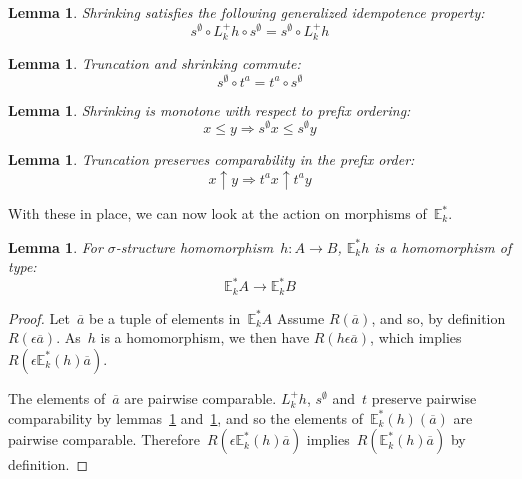 \documentclass{article}
\theoremstyle{plain}
\newtheorem{lemma}[theorem]{Lemma}
\theoremstyle{definition}
\theoremstyle{remark}
\numberwithin{theorem}{section}
\begin{document}
\begin{lemma}
\label{lem:s-idem}
Shrinking satisfies the following generalized idempotence property:
\begin{equation*}
    s^\emptyset \circ L^+_k h \circ s^\emptyset = s^\emptyset \circ L^+_k h
\end{equation*}
\end{lemma}
\begin{lemma}
\label{lem:t-s-commute}
Truncation and shrinking commute:
\begin{equation*}
    s^\emptyset \circ t^a = t^a \circ s^\emptyset
\end{equation*}
\end{lemma}
\begin{lemma}
\label{lem:s-monotone}
Shrinking is monotone with respect to prefix ordering:
\begin{equation*}
    x \leq y \Rightarrow s^\emptyset x \leq s^\emptyset y
\end{equation*}
\end{lemma}
\begin{lemma}
\label{lem:t-pres-comparability}
Truncation preserves comparability in the prefix order:
\begin{equation*}
    x \uparrow y \Rightarrow t^a x \uparrow t^a y
\end{equation*}
\end{lemma}
With these in place, we can now look at the action on morphisms of~$\mathbb{E}^*_k$.
\begin{lemma}
For $\sigma$-structure homomorphism~$h : A \rightarrow B$, $\mathbb{E}^*_k h$ is a homomorphism of type:
\begin{equation*}
    \mathbb{E}^*_k A \rightarrow \mathbb{E}^*_k B
\end{equation*}
\end{lemma}
\begin{proof}
Let~$\overline{a}$ be a tuple of elements in~$\mathbb{E}^*_k A$
Assume $R(\overline{a})$, and so, by definition $R(\epsilon\overline{a})$. As~$h$ is a homomorphism, we then have $R(h\epsilon\overline{a})$, which implies~$R(\epsilon\mathbb{E}^*_k(h)\overline{a})$.

The elements of~$\overline{a}$ are pairwise comparable. $L^+_k h$, $s^\emptyset$ and~$t$ preserve pairwise comparability by lemmas~\ref{lem:s-monotone} and~\ref{lem:t-pres-comparability}, and so the elements of~$\mathbb{E}^*_k(h)(\overline{a})$ are pairwise comparable. Therefore~$R(\epsilon\mathbb{E}^*_k(h)\overline{a})$ implies~$R(\mathbb{E}^*_k(h)\overline{a})$ by definition.
\end{proof}
\end{document}
